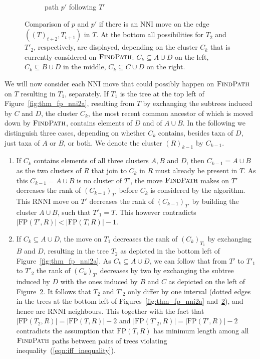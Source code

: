 \documentclass{amsart}
\newcommand{\rnni}{\mathrm{RNNI}}
\newcommand{\findpath}{\textsc{FindPath}}
\newcommand{\nni}{\mathrm{NNI}}
\newcommand{\fp}{\mathrm{FP}}
\begin{document}
\begin{enumerate}[{Case} (1).]
\begin{figure}[H]
\begin{subfigure}[b]{.45\textwidth}
		\vspace{12pt}
		\caption{path $p'$ following $T'$}
		\label{fig:thm_fp_nni2b}
	\end{subfigure}
	\caption{Comparison of $p$ and $p'$ if there is an $\nni$ move on the edge $((T)_{t+2},T_{t+1})$ in $T$.
	At the bottom all possibilities for $T_2$ and $T'_2$, respectively, are displayed, depending on the cluster $C_k$ that is currently considered on $\findpath$:
	${C_k \subseteq A \cup D}$ on the left, ${C_k \subseteq B \cup D}$ in the middle, ${C_k \subseteq C \cup D}$ on the right.}
\end{figure}

We will now consider each $\nni$ move that could possibly happen on $\findpath$ on $T$ resulting in $T_1$, separately.
If $T_1$ is the tree at the top left of Figure~\ref{fig:thm_fp_nni2a}, resulting from $T$ by exchanging the subtrees induced by $C$ and $D$, the cluster $C_k$, the most recent common ancestor of which is moved down by $\findpath$, contains elements of $D$ and of $A \cup B$.
In the following we distinguish three cases, depending on whether $C_k$ contains, besides taxa of $D$, just taxa of $A$ or $B$, or both.
We denote the cluster $(R)_{k-1}$ by $C_{k-1}$.

\begin{enumerate}
    \item If $C_k$ contains elements of all three clusters $A, B$ and $D$, then $C_{k-1} = A \cup B$ as the two clusters of $R$ that join to $C_k$ in $R$ must already be present in $T$.
    As this $C_{k-1} = A \cup B$ is no cluster of $T'$, the move $\findpath$ makes on $T'$ decreases the rank of $(C_{k-1})_{T'}$ before $C_k$ is considered by the algorithm.
    This $\rnni$ move on $T'$ decreases the rank of $(C_{k-1})_{T'}$ by building the cluster $A \cup B$, such that $T'_1 = T$.
	This however contradicts $|\fp(T',R)| < |\fp(T,R)| - 1$.

    \item If $C_k \subseteq A \cup D$, the move on $T_1$ decreases the rank of $(C_k)_{T_1}$ by exchanging $B$ and $D$, resulting in the tree  $T_2$ as depicted in the bottom left of Figure~\ref{fig:thm_fp_nni2a}.
	As $C_k \subseteq A \cup D$, we can follow that from $T'$ to $T'_1$ to $T'_2$ the rank of $(C_k)_{T'}$ decreases by two by exchanging the subtree induced by $D$ with the ones induced by $B$ and $C$ as depicted on the left of Figure~\ref{fig:thm_fp_nni2b}.
	It follows that $T_2$ and $T'_2$ only differ by one interval (dotted edges in the trees at the bottom left of Figures~\ref{fig:thm_fp_nni2a} and~\ref{fig:thm_fp_nni2b}), and hence are $\rnni$ neighbours.
	This together with the fact that $|\fp(T_2,R)| = |\fp(T,R)|-2$ and  $|\fp(T'_2,R)| = |\fp(T',R)|-2$ contradicts the assumption that $\fp(T,R)$ has minimum length among all $\findpath$ paths between pairs of trees violating inequality~(\ref{eqn:iff_inequality}).


\end{enumerate}
\end{enumerate}
\end{document}
